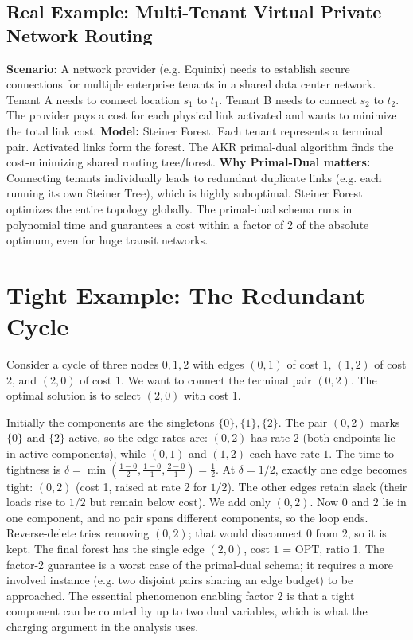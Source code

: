 \subsection*{Real Example: Multi-Tenant Virtual Private Network Routing}
\textbf{Scenario:} A network provider (e.g. Equinix) needs to establish secure connections for multiple enterprise tenants in a shared data center network. Tenant A needs to connect location $s_1$ to $t_1$. Tenant B needs to connect $s_2$ to $t_2$. The provider pays a cost for each physical link activated and wants to minimize the total link cost.
\textbf{Model:} Steiner Forest. Each tenant represents a terminal pair. Activated links form the forest. The AKR primal-dual algorithm finds the cost-minimizing shared routing tree/forest.
\textbf{Why Primal-Dual matters:} Connecting tenants individually leads to redundant duplicate links (e.g. each running its own Steiner Tree), which is highly suboptimal. Steiner Forest optimizes the entire topology globally. The primal-dual schema runs in polynomial time and guarantees a cost within a factor of 2 of the absolute optimum, even for huge transit networks.

\section{Tight Example: The Redundant Cycle}
Consider a cycle of three nodes $0, 1, 2$ with edges $(0, 1)$ of cost 1, $(1, 2)$ of cost 2, and $(2, 0)$ of cost 1. We want to connect the terminal pair $(0, 2)$.
The optimal solution is to select $(2, 0)$ with cost 1.

Initially the components are the singletons $\{0\}, \{1\}, \{2\}$. The pair $(0,2)$ marks $\{0\}$ and $\{2\}$ active, so the edge rates are:
$(0,2)$ has rate $2$ (both endpoints lie in active components), while $(0,1)$ and $(1,2)$ each have rate $1$.
The time to tightness is $\delta = \min\left( \frac{1-0}{2}, \frac{1-0}{1}, \frac{2-0}{1} \right) = \frac{1}{2}$.
At $\delta = 1/2$, exactly one edge becomes tight: $(0,2)$ (cost 1, raised at rate 2 for $1/2$). The other edges retain slack (their loads rise to $1/2$ but remain below cost). We add only $(0,2)$. Now $0$ and $2$ lie in one component, and no pair spans different components, so the loop ends.
Reverse-delete tries removing $(0,2)$; that would disconnect $0$ from $2$, so it is kept. The final forest has the single edge $(2, 0)$, cost $1$ = OPT, ratio 1.
The factor-2 guarantee is a worst case of the primal-dual schema; it requires a more involved instance (e.g. two disjoint pairs sharing an edge budget) to be approached. The essential phenomenon enabling factor 2 is that a tight component can be counted by up to two dual variables, which is what the charging argument in the analysis uses.

